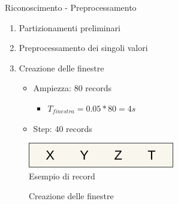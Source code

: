 \begin{tframe}{Riconoscimento - Preprocessamento}

    \begin{minipage}{0.64\textwidth}
        \begin{enumerate}
            \item Partizionamenti preliminari
            \item Preprocessamento dei singoli valori
            \item Creazione delle finestre
                \begin{itemize}
                    \item Ampiezza: 80 records
                        \begin{itemize}
                            \item $T_{finestra} = 0.05 * 80 = 4s$
                        \end{itemize}
                    \item Step: 40 records
                \end{itemize}
    
        \end{enumerate}
    \end{minipage}%
    \hfill
    \begin{minipage}{0.36\textwidth}
        
        \begin{figure}
            \includegraphics[scale = 0.35]{assets/images/classification/record2.png}
            \caption*{Esempio di record}
        \end{figure}
        
    \end{minipage}%

    \vspace{3mm}
    \vfill
    \begin{figure}
        
        \caption*{Creazione delle finestre}
    \end{figure}

\end{tframe}